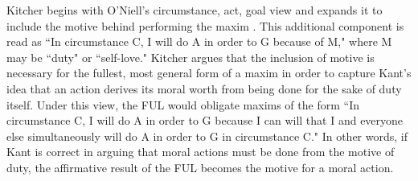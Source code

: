 \begin{isabellebody}
\begin{isamarkuptext}
Kitcher begins with O'Niell's circumstance, act, goal view and expands it to include the motive 
behind performing the maxim \cite{whatisamaxim}. This additional component is read 
as ``In circumstance C, I will do A in order to G because of M," where M may be ``duty" or ``self-love."
Kitcher argues that the inclusion of motive is necessary for the fullest, most general form of a maxim
in order to capture Kant's idea that an action derives its moral worth from being done for the sake of duty itself.
Under this view, the FUL would obligate maxims of the form 
``In circumstance C, I will do A in order to G because I can will that I and everyone else simultaneously
will do A in order to G in circumstance C." In other words, if Kant is correct in arguing that moral 
actions must be done from the motive of duty, the affirmative result of the FUL becomes 
the motive for a moral action.


\end{isamarkuptext}
\end{isabellebody}
